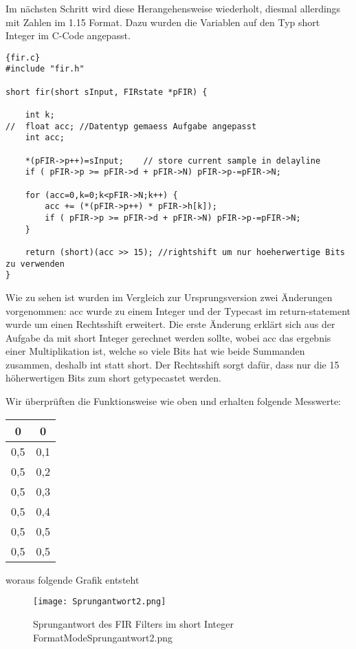  Im nächsten Schritt wird diese Herangehensweise wiederholt, diesmal allerdings mit Zahlen im 1.15 Format. Dazu wurden die Variablen auf den Typ short Integer im C-Code angepasst.
 \begin{adjustbox}{width=\textwidth,height=\textheight,keepaspectratio}
 \begin{lstlisting}[title=fir.c]{fir.c}
#include "fir.h"

short fir(short sInput, FIRstate *pFIR) {

	int k;
//	float acc; //Datentyp gemaess Aufgabe angepasst
	int acc;
	
	*(pFIR->p++)=sInput;	// store current sample in delayline
	if ( pFIR->p >= pFIR->d + pFIR->N) pFIR->p-=pFIR->N;

	for (acc=0,k=0;k<pFIR->N;k++) {
		acc += (*(pFIR->p++) * pFIR->h[k]);
		if ( pFIR->p >= pFIR->d + pFIR->N) pFIR->p-=pFIR->N;
	}
	
	return (short)(acc >> 15); //rightshift um nur hoeherwertige Bits zu verwenden
}
\end{lstlisting}
\end{adjustbox}
Wie zu sehen ist wurden im Vergleich zur Ursprungsversion zwei \"Anderungen vorgenommen: acc wurde zu einem Integer und der Typecast im return-statement wurde um einen Rechtsshift erweitert. Die erste \"Anderung erklärt sich aus der Aufgabe da mit short Integer gerechnet werden sollte, wobei acc das ergebnis einer Multiplikation ist, welche so viele Bits hat wie beide Summanden zusammen, deshalb int statt short. Der Rechtsshift sorgt daf\"ur, dass nur die 15 h\"oherwertigen Bits zum short getypecastet werden.\\\par
Wir \"uberprüften die Funktionsweise wie oben und erhalten folgende Messwerte:
\begin{tabular}{|c|c|}
\hline 
0 & 0 \\ 
\hline 
0,5 & 0,1 \\ 
\hline 
0,5 & 0,2 \\ 
\hline 
0,5 & 0,3 \\ 
\hline 
0,5 & 0,4 \\ 
\hline 
0,5 & 0,5 \\ 
\hline 
0,5 & 0,5 \\ 
\hline 
\end{tabular} 
woraus folgende Grafik entsteht 
\begin{figure}[H]
  \centering
    \texttt{[image: Sprungantwort2.png]}
  \caption{Sprungantwort des FIR Filters im short Integer Format\textunderscore Mode\textunderscore Sprungantwort2.png}
  \label{fig:SprAW2.png}%
\end{figure}
